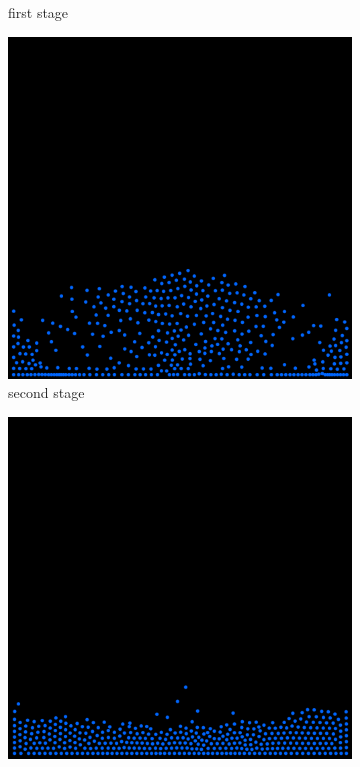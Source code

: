 \begin{figure}[h]
\begin{subfigure}[b]{0.2\textwidth}
        \caption{first stage}
    \end{subfigure}
    \hspace{1em}
    \begin{subfigure}[b]{0.2\textwidth}
        \includegraphics[width=\textwidth]{figures/particle400_3.png}
        \caption{second stage}
    \end{subfigure}
    \hspace{1em}
    \begin{subfigure}[b]{0.2\textwidth}
        \includegraphics[width=\textwidth]{figures/particle400_4.png}

\end{subfigure}
\end{figure}
